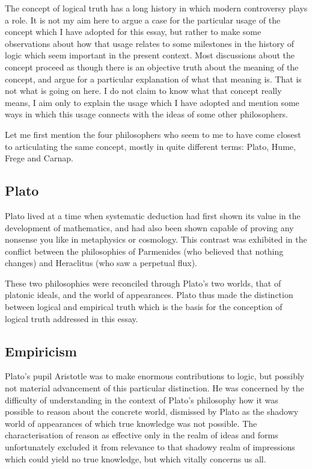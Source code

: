 \documentclass[10pt,titlepage]{book}
\begin{document}
The concept of logical truth has a long history in which modern controversy plays a role.
It is not my aim here to argue a case for the particular usage of the concept which I have adopted for this essay, but rather to make some observations about how that usage relates to some milestones in the history of logic which seem important in the present context.
Most discussions about the concept proceed as though there is an objective truth about the meaning of the concept, and argue for a particular explanation of what that meaning is.
That is not what is going on here.
I do not claim to know what that concept really means, I aim only to explain the usage which I have adopted and mention some ways in which this usage connects with the ideas of some other philosophers.

Let me first mention the four philosophers who seem to me to have come closest to articulating the same concept, mostly in quite different terms: Plato, Hume, Frege and Carnap.


\subsection{Plato}

Plato lived at a time when systematic deduction had first shown its value in the development of mathematics, and had also been shown capable of proving any nonsense you like in metaphysics or cosmology.
This contrast was exhibited in the conflict between the philosophies of Parmenides (who believed that nothing changes) and Heraclitus (who saw a perpetual flux).

These two philosophies were reconciled through Plato's two worlds, that of platonic ideals, and the world of appearances.
Plato thus made the distinction between logical and empirical truth which is the basis for the conception of logical truth addressed in this essay.

\subsection{Empiricism}

Plato's pupil Aristotle was to make enormous contributions to logic, but possibly not material advancement of this particular distinction.
He was concerned by the difficulty of understanding in the context of Plato's philosophy how it was possible to reason about the concrete world, dismissed by Plato as the shadowy world of appearances of which true knowledge was not possible.
The characterisation of reason as effective only in the realm of ideas and forms unfortunately excluded it from relevance to that shadowy realm of impressions which could yield no true knowledge, but which vitally concerns us all.
\end{document}
